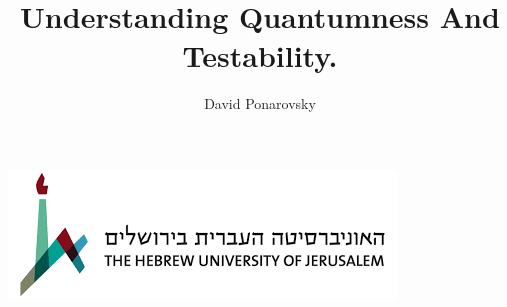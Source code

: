 \documentclass[11pt]{book}
\begin{document}


\title{Understanding Quantumness And Testability.} 
\author{David Ponarovsky}
\includegraphics{logo.png}
\maketitle

%

\tableofcontents
\listoffigures

% 








\printbibliography[heading=bibliography]
\end{document}
